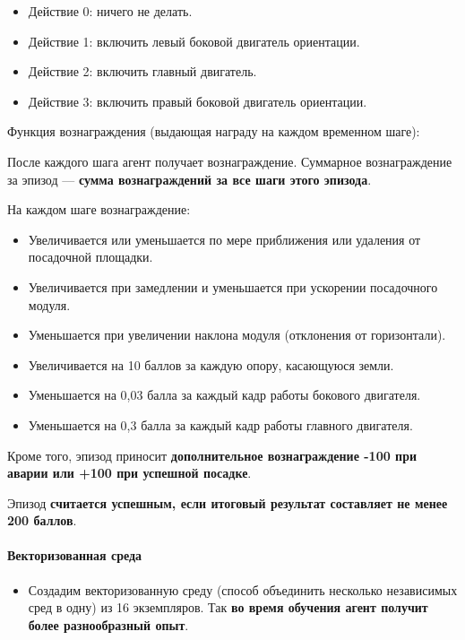 \documentclass[11pt,a4paper]{article}
\begin{document}
\begin{itemize}
\tightlist
\item
  Действие 0: ничего не делать.
\item
  Действие 1: включить левый боковой двигатель ориентации.
\item
  Действие 2: включить главный двигатель.
\item
  Действие 3: включить правый боковой двигатель ориентации.
\end{itemize}

Функция вознаграждения (выдающая награду на каждом временном шаге):

После каждого шага агент получает вознаграждение. Суммарное вознаграждение за эпизод --- \textbf{сумма вознаграждений за все шаги этого эпизода}.

На каждом шаге вознаграждение:

\begin{itemize}
\tightlist
\item
  Увеличивается или уменьшается по мере приближения или удаления от посадочной площадки.
\item
  Увеличивается при замедлении и уменьшается при ускорении посадочного модуля.
\item
  Уменьшается при увеличении наклона модуля (отклонения от горизонтали).
\item
  Увеличивается на 10 баллов за каждую опору, касающуюся земли.
\item
  Уменьшается на 0,03 балла за каждый кадр работы бокового двигателя.
\item
  Уменьшается на 0,3 балла за каждый кадр работы главного двигателя.
\end{itemize}

Кроме того, эпизод приносит \textbf{дополнительное вознаграждение -100 при аварии или +100 при успешной посадке}.

Эпизод \textbf{считается успешным, если итоговый результат составляет не менее 200 баллов}.

\paragraph{Векторизованная среда}\label{vectorized-environment}

\begin{itemize}
\tightlist
\item
  Создадим векторизованную среду (способ объединить несколько независимых сред в одну) из 16 экземпляров. Так \textbf{во время обучения агент получит более разнообразный опыт}.
\end{itemize}
\end{document}
